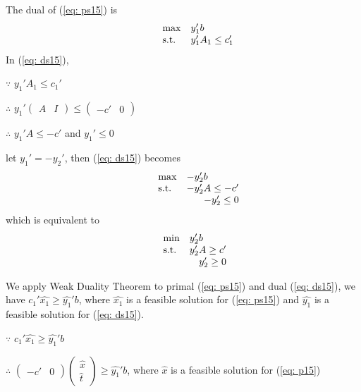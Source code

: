 The dual of (\ref{eq: ps15}) is
\begin{equation}
\label{eq: ds15}
  \begin{array}{lrcll}
    \max
    & \multicolumn{4}{l}{y_{1}'b} \\
    \text{s.t.}
    & y_{1}'A_{1}\leq c_{1}'
  \end{array}
\end{equation}
In (\ref{eq: ds15}), 

$\because$ $y_{1}'A_{1}\leq c_{1}'$

$\therefore$ $y_{1}' \left( \begin{array}{cc} A & I \end{array}\right) \leq \left( \begin{array}{cc} -c' & 0 \end{array}\right)$

$\therefore$ $y_{1}'A\leq -c'$ and $y_{1}' \leq 0$

let $y_{1}'=-y_{2}'$, then (\ref{eq: ds15}) becomes
\begin{equation}
\label{eq: ds115}
  \begin{array}{lrcll}
    \max
    & \multicolumn{4}{l}{-y_{2}'b} \\
    \text{s.t.}
    & -y_{2}'A\leq -c'\\
    & -y_{2}'\leq 0
  \end{array}
\end{equation}
which is equivalent to
\begin{equation}
\label{eq: ds215}
  \begin{array}{lrcll}
    \min
    & \multicolumn{4}{l}{y_{2}'b} \\
    \text{s.t.}
    & y_{2}'A\geq c'\\
    & y_{2}'\geq 0
  \end{array}
\end{equation}

We apply Weak Duality Theorem to primal (\ref{eq: ps15}) and dual (\ref{eq: ds15}), we have $c_{1}'\widehat{x_{1}} \geq \widehat{y_{1}}'b$, where $\widehat{x_{1}}$ is a feasible solution for (\ref{eq: ps15}) and $\widehat{y_{1}}$ is a feasible solution for (\ref{eq: ds15}).

$\because$  $c_{1}'\widehat{x_{1}} \geq \widehat{y_{1}}'b$

$\therefore$ $ \left( \begin{array}{cc} -c' & 0 \end{array}\right)  \left( \begin{array}{c} \widehat{x} \\ \widehat{t} \end{array}\right) \geq \widehat{y_{1}}'b$, where $\widehat{x}$ is a feasible solution for (\ref{eq: p15})

